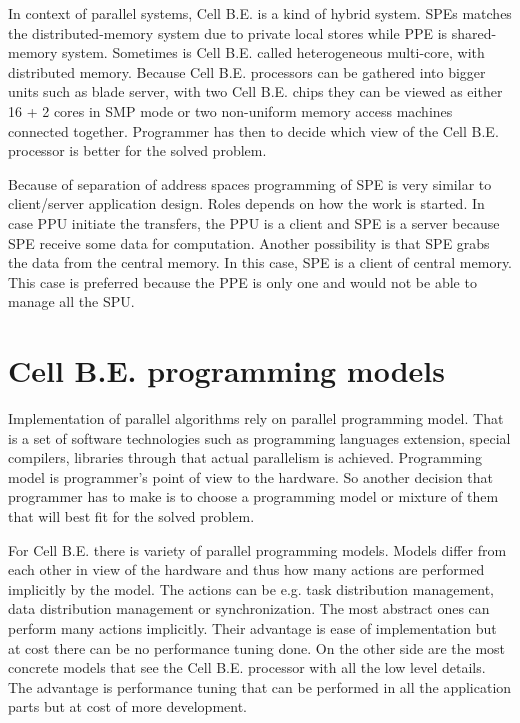 In context of parallel systems, Cell B.E. is a kind of hybrid system.
SPEs matches the distributed-memory system due to private local stores while PPE is shared-memory system.
Sometimes is Cell B.E. called heterogeneous multi-core, with distributed memory.
Because Cell B.E. processors can be gathered into bigger units such as blade server, with two Cell B.E. chips they can be viewed as either 16 + 2 cores in SMP mode or two non-uniform memory access machines connected together.
Programmer has then to decide which view of the Cell B.E. processor is better for the solved problem.

\par
Because of separation of address spaces programming of SPE is very similar to client/server application design.
Roles depends on how the work is started.
In case PPU initiate the transfers, the PPU is a client and SPE is a server because SPE receive some data for computation.
Another possibility is that SPE grabs the data from the central memory.
In this case, SPE is a client of central memory.
This case is preferred because the PPE is only one and would not be able to manage all the SPU.

\section{Cell B.E. programming models}

\par
Implementation of parallel algorithms rely on parallel programming model.
That is a set of software technologies such as programming languages extension, special compilers, libraries through that actual parallelism is achieved.
Programming model is programmer's point of view to the hardware.
So another decision that programmer has to make is to choose a programming model or mixture of them that will best fit for the solved problem.

\par
For Cell B.E. there is variety of parallel programming models.
Models differ from each other in view of the hardware and thus how many actions are performed implicitly by the model.
The actions can be e.g. task distribution management, data distribution management or synchronization.
The most abstract ones can perform many actions implicitly.
Their advantage is ease of implementation but at cost there can be no performance tuning done.
On the other side are the most concrete models that see the Cell B.E. processor with all the low level details.
The advantage is performance tuning that can be performed in all the application parts but at cost of more development.

